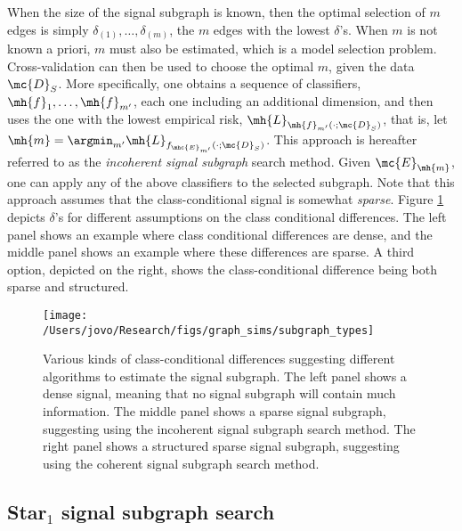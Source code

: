 When the size of the signal subgraph is known, then the optimal selection of $m$ edges is simply $\delta_{(1)},\ldots, \delta_{(m)}$, the $m$ edges with the lowest $\delta$'s.  When $m$ is not known a priori, $m$ must also be estimated, which is a model selection problem.   Cross-validation can then be used to choose the optimal $m$, given the data $\mc{D}_S$.  More specifically, one obtains a sequence of classifiers, $\mh{f}_1, \ldots, \mh{f}_{m'}$, each one including an additional dimension, and then uses the one with the lowest empirical risk, $\mh{L}_{\mh{f}_{m'}(\cdot; \mc{D}_S)}$, that is, let $\mh{m}=\argmin_{m'} \mh{L}_{f_{\mhc{E}_{m'}}(\cdot; \mc{D}_S)}$.  This approach is hereafter referred to as the \emph{incoherent signal subgraph} search method.  Given $\mc{E}_{\mh{m}}$, one can apply any of the above classifiers to the selected subgraph.  Note that this approach assumes that the class-conditional signal is somewhat \emph{sparse}.  Figure \ref{fig:subgraph_types} depicts $\delta$'s for different assumptions on the class conditional differences.  The left panel shows an example where class conditional differences are dense, and the middle panel shows an example where these differences are sparse.  A third option, depicted on the right, shows the class-conditional difference being both sparse and structured.



\begin{figure}[h!]
\centering \texttt{[image: /Users/jovo/Research/figs/graph\_sims/subgraph\_types]}
\caption{Various kinds of class-conditional differences suggesting different algorithms to estimate the signal subgraph.  The left panel shows a dense signal, meaning that no signal subgraph will contain much information.  The middle panel shows a sparse signal subgraph, suggesting using the incoherent signal subgraph search method.  The right panel shows a structured sparse signal subgraph, suggesting using the coherent signal subgraph search method.}
\label{fig:subgraph_types}
\end{figure}



\subsection{Star$_1$ signal subgraph search} %
\label{sub:utilizing_graph_structure}

